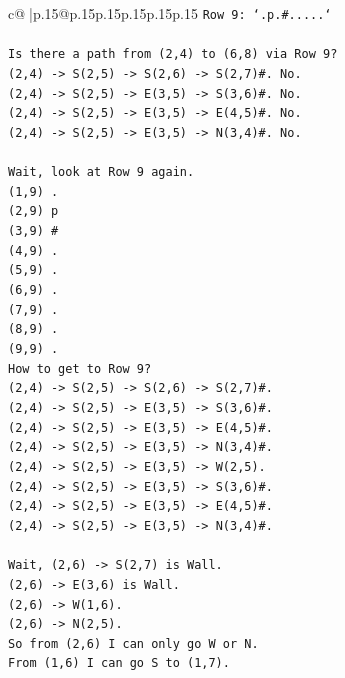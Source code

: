 \documentclass{article}
\begin{document}
{\begin{supertabular}{c@{$\;$}|p{.15\linewidth}@{}p{.15\linewidth}p{.15\linewidth}p{.15\linewidth}p{.15\linewidth}p{.15\linewidth}}
{{{\texttt{Row 9: `.p.\#.....`} \\
\\ 
\texttt{Is there a path from (2,4) to (6,8) via Row 9?} \\
\texttt{(2,4) {-}> S(2,5) {-}> S(2,6) {-}> S(2,7)\#. No.} \\
\texttt{(2,4) {-}> S(2,5) {-}> E(3,5) {-}> S(3,6)\#. No.} \\
\texttt{(2,4) {-}> S(2,5) {-}> E(3,5) {-}> E(4,5)\#. No.} \\
\texttt{(2,4) {-}> S(2,5) {-}> E(3,5) {-}> N(3,4)\#. No.} \\
\\ 
\texttt{Wait, look at Row 9 again.} \\
\texttt{(1,9) .} \\
\texttt{(2,9) p} \\
\texttt{(3,9) \#} \\
\texttt{(4,9) .} \\
\texttt{(5,9) .} \\
\texttt{(6,9) .} \\
\texttt{(7,9) .} \\
\texttt{(8,9) .} \\
\texttt{(9,9) .} \\
\texttt{How to get to Row 9?} \\
\texttt{(2,4) {-}> S(2,5) {-}> S(2,6) {-}> S(2,7)\#.} \\
\texttt{(2,4) {-}> S(2,5) {-}> E(3,5) {-}> S(3,6)\#.} \\
\texttt{(2,4) {-}> S(2,5) {-}> E(3,5) {-}> E(4,5)\#.} \\
\texttt{(2,4) {-}> S(2,5) {-}> E(3,5) {-}> N(3,4)\#.} \\
\texttt{(2,4) {-}> S(2,5) {-}> E(3,5) {-}> W(2,5).} \\
\texttt{(2,4) {-}> S(2,5) {-}> E(3,5) {-}> S(3,6)\#.} \\
\texttt{(2,4) {-}> S(2,5) {-}> E(3,5) {-}> E(4,5)\#.} \\
\texttt{(2,4) {-}> S(2,5) {-}> E(3,5) {-}> N(3,4)\#.} \\
\\ 
\texttt{Wait, (2,6) {-}> S(2,7) is Wall.} \\
\texttt{(2,6) {-}> E(3,6) is Wall.} \\
\texttt{(2,6) {-}> W(1,6).} \\
\texttt{(2,6) {-}> N(2,5).} \\
\texttt{So from (2,6) I can only go W or N.} \\
\texttt{From (1,6) I can go S to (1,7).} \\
}}}
\end{supertabular}}
\end{document}
